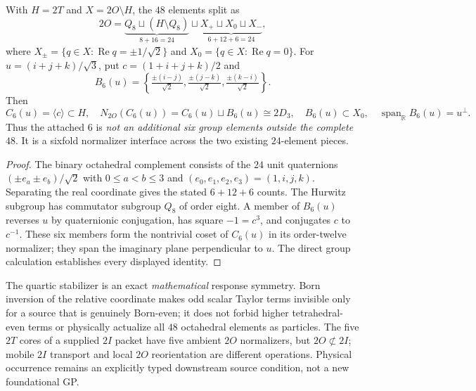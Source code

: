 \documentclass[11pt]{article}
\begin{document}
\begin{proposition}
\label{p1b:prop:v18-octahedral-sixfold-attachment}
With $H=2T$ and $X=2O\setminus H$, the $48$ elements split as
\[
 \boxed{2O=\underbrace{Q_8\sqcup(H\setminus Q_8)}_{8+16=24}
          \sqcup\underbrace{X_+\sqcup X_0\sqcup X_-}_{6+12+6=24},}
\]
where $X_{\pm}=\{q\in X:\operatorname{Re}q=\pm1/\sqrt2\}$
and $X_0=\{q\in X:\operatorname{Re}q=0\}$.  For
$u=(i+j+k)/\sqrt3$, put $c=(1+i+j+k)/2$ and
\[
 B_6(u)=\left\{\tfrac{\pm(i-j)}{\sqrt2},
                   \tfrac{\pm(j-k)}{\sqrt2},
                   \tfrac{\pm(k-i)}{\sqrt2}\right\}.
\]
Then
\[
 C_6(u)=\langle c\rangle\subset H,\quad
 N_{2O}(C_6(u))=C_6(u)\sqcup B_6(u)\cong2D_3,
 \quad B_6(u)\subset X_0,\quad
 \operatorname{span}_{\mathbb R}B_6(u)=u^\perp.
\]
Thus the attached $6$ is \emph{not an additional six group elements
outside the complete $48$}.  It is a sixfold normalizer interface
across the two existing $24$-element pieces.
\end{proposition}
\begin{proof}
The binary octahedral complement consists of the $24$ unit
quaternions $(\pm e_a\pm e_b)/\sqrt2$ with $0\le a<b\le3$
and $(e_0,e_1,e_2,e_3)=(1,i,j,k)$.  Separating the real
coordinate gives the stated $6+12+6$ counts.  The Hurwitz subgroup
has commutator subgroup $Q_8$ of order eight.  A member of $B_6(u)$
reverses $u$ by quaternionic conjugation, has square $-1=c^3$,
and conjugates $c$ to $c^{-1}$.  These six members form the nontrivial
coset of $C_6(u)$ in its order-twelve normalizer; they span the
imaginary plane perpendicular to $u$.  The direct group calculation
establishes every displayed identity.
\end{proof}

\begin{remark}
\label{p1b:rem:v18-particle-response-frontier}
The quartic stabilizer is an exact \emph{mathematical} response symmetry.
Born inversion of the relative coordinate makes odd scalar Taylor
terms invisible only for a source that is genuinely Born-even; it does
not forbid higher tetrahedral-even terms or physically actualize all
$48$ octahedral elements as particles.  The five $2T$ cores of a
supplied $2I$ packet have five ambient $2O$ normalizers, but
$2O\not\subset2I$; mobile $2I$ transport and local $2O$ reorientation
are different operations.  Physical occurrence remains an explicitly
typed downstream source condition, not a new foundational GP.
\end{remark}
\end{document}
